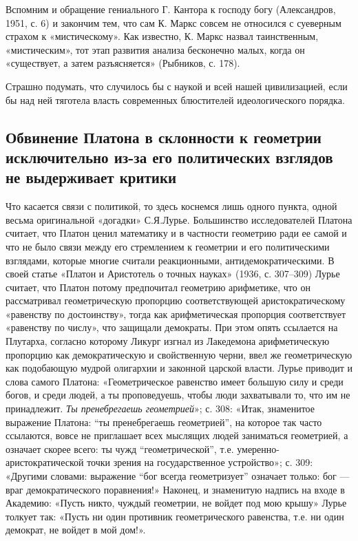 Вспомним   и  обращение   гениального  Г.   Кантора  к   господу  богу
(Александров, 1951,  с. 6)  и закончим  тем, что  сам К.  Маркс совсем
не  относился  с суеверным  страхом  к  «мистическому». Как  известно,
К.  Маркс  назвал  таинственным,   «мистическим»,  тот  этап  развития
анализа бесконечно малых, когда  он «существует, а затем разъясняется»
(Рыбников, с. 178).

Страшно   подумать,  что   случилось  бы   с  наукой   и  всей   нашей
цивилизацией, если бы над  ней тяготела власть современных блюстителей
идеологического порядка.

\subsection{Обвинение Платона  в склонности к  геометрии исключительно
из-за его политических взглядов не выдерживает критики}

Что  касается  связи  с  политикой,  то  здесь  коснемся  лишь  одного
пункта,  одной весьма  оригинальной  «догадки» С.Я.Лурье.  Большинство
исследователей  Платона  считает,  что  Платон ценил  математику  и  в
частности  геометрию ради  ее  самой и  что не  было  связи между  его
стремлением к геометрии и  его политическими взглядами, которые многие
считали реакционными,  антидемократическими. В своей статье  «Платон и
Аристотель о  точных науках»  (1936, с.  307--309) Лурье  считает, что
Платон потому  предпочитал геометрию  арифметике, что  он рассматривал
геометрическую пропорцию соответствующей аристократическому «равенству
по  достоинству»,  тогда  как арифметическая  пропорция  соответствует
«равенству  по   числу»,  что  защищали  демократы.   При  этом  опять
ссылается   на   Плутарха,   согласно  которому   Ликург   изгнал   из
Лакедемона арифметическую пропорцию как демократическую и свойственную
черни,  ввел  же  геометрическую  как подобающую  мудрой  олигархии  и
законной  царской  власти.  Лурье  приводит и  слова  самого  Платона:
«Геометрическое равенство  имеет большую силу  и среди богов,  и среди
людей,  а  ты проповедуешь,  чтобы  люди  захватывали  то, что  им  не
принадлежит.  \emph{Ты  пренебрегаешь  геометрией}»;  с.  308:  «Итак,
знаменитое  выражение  Платона:  ``ты пренебрегаешь  геометрией'',  на
которое  так  часто  ссылаются,  вовсе  не  приглашает  всех  мыслящих
людей  заниматься  геометрией,  а   означает  скорее  всего:  ты  чужд
``геометрической'',  т.е. умеренно-аристократической  точки зрения  на
государственное устройство»; с. 309: «Другими словами: выражение ``бог
всегда геометризует''  означает только: бог ---  враг демократического
поравнения!» Наконец, и знаменитую надпись на входе в Академию: «Пусть
никто, чуждый геометрии,  не войдет под мою крышу»  Лурье толкует так:
«Пусть  ни  один противник  геометрического  равенства,  т.е. ни  один
демократ, не войдет в мой дом!».

